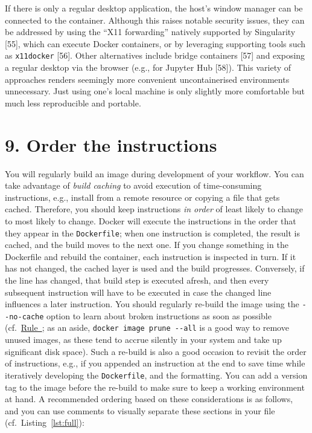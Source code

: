 \documentclass[10pt,letterpaper]{article}
\begin{document}
\normalsize

If there is only a regular desktop application, the host's window
manager can be connected to the container. Although this raises notable
security issues, they can be addressed by using the ``X11 forwarding''
natively supported by Singularity {[}55{]}, which can execute Docker
containers, or by leveraging supporting tools such as \texttt{x11docker}
{[}56{]}. Other alternatives include bridge containers {[}57{]} and
exposing a regular desktop via the browser (e.g., for Jupyter Hub
{[}58{]}). This variety of approaches renders seemingly more convenient
uncontainerised environments unnecessary. Just using one's local machine
is only slightly more comfortable but much less reproducible and
portable.

\hypertarget{order-the-instructions}{%
\section{9. Order the instructions}\label{order-the-instructions}}

  \label{rule:order} 

You will regularly build an image during development of your workflow.
You can take advantage of \emph{build caching} to avoid execution of
time-consuming instructions, e.g., install from a remote resource or
copying a file that gets cached. Therefore, you should keep instructions
\emph{in order} of least likely to change to most likely to change.
Docker will execute the instructions in the order that they appear in
the \texttt{Dockerfile}; when one instruction is completed, the result
is cached, and the build moves to the next one. If you change something
in the Dockerfile and rebuild the container, each instruction is
inspected in turn. If it has not changed, the cached layer is used and
the build progresses. Conversely, if the line has changed, that build
step is executed afresh, and then every subsequent instruction will have
to be executed in case the changed line influences a later instruction.
You should regularly re-build the image using the \texttt{-\/-no-cache}
option to learn about broken instructions as soon as possible
(cf.~\hyperref[{rule:usage}]{Rule~}; as an aside,
\texttt{docker\ image\ prune\ -\/-all} is a good way to remove unused
images, as these tend to accrue silently in your system and take up
significant disk space). Such a re-build is also a good occasion to
revisit the order of instructions, e.g., if you appended an instruction
at the end to save time while iteratively developing the
\texttt{Dockerfile}, and the formatting. You can add a version tag to
the image before the re-build to make sure to keep a working environment
at hand. A recommended ordering based on these considerations is as
follows, and you can use comments to visually separate these sections in
your file (cf.~Listing~\ref{lst:full}):
\end{document}

